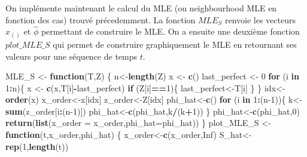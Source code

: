 \documentclass[
]{article}
\newenvironment{Shaded}{\begin{snugshade}}{\end{snugshade}}
\newcommand{\AttributeTok}[1]{\textcolor[rgb]{0.13,0.29,0.53}{#1}}
\newcommand{\ConstantTok}[1]{\textcolor[rgb]{0.56,0.35,0.01}{#1}}
\newcommand{\ControlFlowTok}[1]{\textcolor[rgb]{0.13,0.29,0.53}{\textbf{#1}}}
\newcommand{\DecValTok}[1]{\textcolor[rgb]{0.00,0.00,0.81}{#1}}
\newcommand{\FunctionTok}[1]{\textcolor[rgb]{0.13,0.29,0.53}{\textbf{#1}}}
\newcommand{\NormalTok}[1]{#1}
\newcommand{\OtherTok}[1]{\textcolor[rgb]{0.56,0.35,0.01}{#1}}
\newcommand{\SpecialCharTok}[1]{\textcolor[rgb]{0.81,0.36,0.00}{\textbf{#1}}}
\begin{document}
On implémente maintenant le calcul du MLE (ou neighbourhood MLE en
fonction des cas) trouvé précedemment. La fonction \(MLE_S\) renvoie les
vecteurs \(x_{()}\) et \(\hat \phi\) permettant de construire le MLE. On
a ensuite une deuxième fonction \(plot\_MLE\_S\) qui permet de
construire graphiquement le MLE en retournant ses valeurs pour une
séquence de temps \(t\).

\begin{Shaded}
\begin{Highlighting}[]
\NormalTok{MLE\_S }\OtherTok{\textless{}{-}} \ControlFlowTok{function}\NormalTok{(T,Z)}
\NormalTok{\{}
\NormalTok{  n}\OtherTok{\textless{}{-}}\FunctionTok{length}\NormalTok{(Z)}
\NormalTok{  x }\OtherTok{\textless{}{-}} \FunctionTok{c}\NormalTok{()}
\NormalTok{  last\_perfect }\OtherTok{\textless{}{-}} \DecValTok{0}
  \ControlFlowTok{for}\NormalTok{ (i }\ControlFlowTok{in} \DecValTok{1}\SpecialCharTok{:}\NormalTok{n)\{}
\NormalTok{    x }\OtherTok{\textless{}{-}} \FunctionTok{c}\NormalTok{(x,T[i]}\SpecialCharTok{{-}}\NormalTok{last\_perfect)}
  \ControlFlowTok{if}\NormalTok{ (Z[i]}\SpecialCharTok{==}\DecValTok{1}\NormalTok{)\{}
\NormalTok{    last\_perfect}\OtherTok{\textless{}{-}}\NormalTok{T[i]}
\NormalTok{  \}}
\NormalTok{  \}}
\NormalTok{  idx}\OtherTok{\textless{}{-}}\FunctionTok{order}\NormalTok{(x)}
\NormalTok{  x\_order}\OtherTok{\textless{}{-}}\NormalTok{x[idx]}
\NormalTok{  z\_order}\OtherTok{\textless{}{-}}\NormalTok{Z[idx]}
\NormalTok{  phi\_hat}\OtherTok{\textless{}{-}}\FunctionTok{c}\NormalTok{()}
  \ControlFlowTok{for}\NormalTok{ (i }\ControlFlowTok{in} \DecValTok{1}\SpecialCharTok{:}\NormalTok{(n}\DecValTok{{-}1}\NormalTok{))\{}
\NormalTok{    k}\OtherTok{\textless{}{-}}\FunctionTok{sum}\NormalTok{(z\_order[i}\SpecialCharTok{:}\NormalTok{(n}\DecValTok{{-}1}\NormalTok{)])}
\NormalTok{    phi\_hat}\OtherTok{\textless{}{-}}\FunctionTok{c}\NormalTok{(phi\_hat,k}\SpecialCharTok{/}\NormalTok{(k}\SpecialCharTok{+}\DecValTok{1}\NormalTok{))}
\NormalTok{  \}}
\NormalTok{  phi\_hat}\OtherTok{\textless{}{-}}\FunctionTok{c}\NormalTok{(phi\_hat,}\DecValTok{0}\NormalTok{)}
  \FunctionTok{return}\NormalTok{(}\FunctionTok{list}\NormalTok{(}\AttributeTok{x\_order =}\NormalTok{ x\_order,}\AttributeTok{phi\_hat=}\NormalTok{phi\_hat))}
\NormalTok{\}}
\NormalTok{plot\_MLE\_S }\OtherTok{\textless{}{-}}\ControlFlowTok{function}\NormalTok{(t,x\_order,phi\_hat) \{}
\NormalTok{  x\_order}\OtherTok{\textless{}{-}}\FunctionTok{c}\NormalTok{(x\_order,}\ConstantTok{Inf}\NormalTok{)}
\NormalTok{  S\_hat}\OtherTok{\textless{}{-}}\FunctionTok{rep}\NormalTok{(}\DecValTok{1}\NormalTok{,}\FunctionTok{length}\NormalTok{(t))}

\end{Highlighting}
\end{Shaded}
\end{document}
